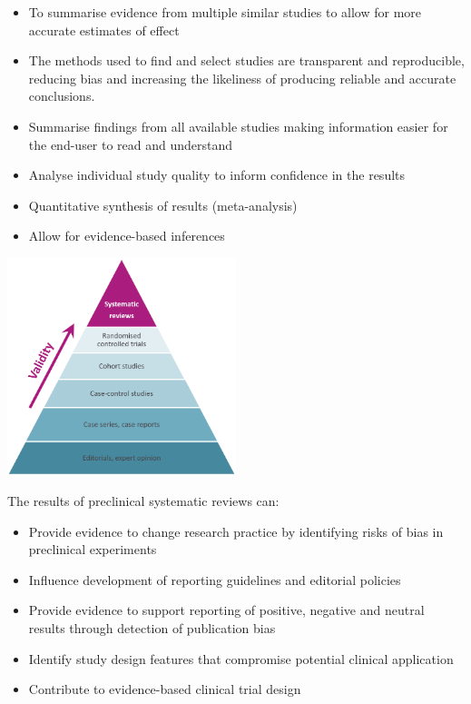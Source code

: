 \documentclass[
]{book}
\providecommand{\tightlist}{%
  \setlength{\itemsep}{0pt}\setlength{\parskip}{0pt}}
\begin{document}
\begin{itemize}
\tightlist
\item
  To summarise evidence from multiple similar studies to allow for more accurate estimates of effect
\item
  The methods used to find and select studies are transparent and reproducible, reducing bias and increasing the likeliness of producing reliable and accurate conclusions.
\item
  Summarise findings from all available studies making information easier for the end-user to read and understand
\item
  Analyse individual study quality to inform confidence in the results
\item
  Quantitative synthesis of results (meta-analysis)
\item
  Allow for evidence-based inferences
\end{itemize}

\includegraphics[width=0.5\textwidth,height=0.5\textheight]{figs/evidence-triangle.png}

The results of preclinical systematic reviews can:

\begin{itemize}
\tightlist
\item
  Provide evidence to change research practice by identifying risks of bias in preclinical experiments
\item
  Influence development of reporting guidelines and editorial policies
\item
  Provide evidence to support reporting of positive, negative and neutral results through detection of publication bias
\item
  Identify study design features that compromise potential clinical application
\item
  Contribute to evidence-based clinical trial design
\end{itemize}
\end{document}
